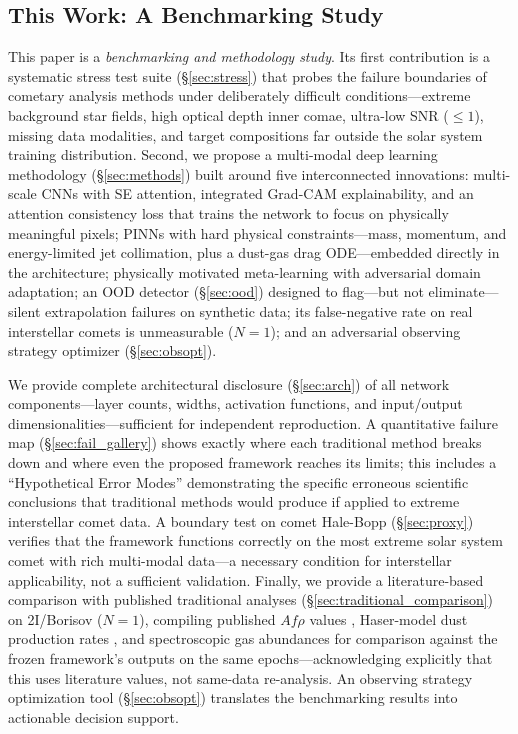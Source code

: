\documentclass[usenatbib]{mnras}
\begin{document}
\subsection{This Work: A Benchmarking Study}

This paper is a \textit{benchmarking and methodology study}. Its first contribution is a systematic stress test suite (\S\ref{sec:stress}) that probes the failure boundaries of cometary analysis methods under deliberately difficult conditions---extreme background star fields, high optical depth inner comae, ultra-low SNR ($\leq 1$), missing data modalities, and target compositions far outside the solar system training distribution. Second, we propose a multi-modal deep learning methodology (\S\ref{sec:methods}) built around five interconnected innovations: multi-scale CNNs with SE attention, integrated Grad-CAM explainability, and an attention consistency loss that trains the network to focus on physically meaningful pixels; PINNs with hard physical constraints---mass, momentum, and energy-limited jet collimation, plus a dust-gas drag ODE---embedded directly in the architecture; physically motivated meta-learning with adversarial domain adaptation; an OOD detector (\S\ref{sec:ood}) designed to flag---but not eliminate---silent extrapolation failures on synthetic data; its false-negative rate on real interstellar comets is unmeasurable ($N=1$); and an adversarial observing strategy optimizer (\S\ref{sec:obsopt}).

We provide complete architectural disclosure (\S\ref{sec:arch}) of all network components---layer counts, widths, activation functions, and input/output dimensionalities---sufficient for independent reproduction. A quantitative failure map (\S\ref{sec:fail_gallery}) shows exactly where each traditional method breaks down and where even the proposed framework reaches its limits; this includes a ``Hypothetical Error Modes'' demonstrating the specific erroneous scientific conclusions that traditional methods would produce if applied to extreme interstellar comet data. A boundary test on comet Hale-Bopp (\S\ref{sec:proxy}) verifies that the framework functions correctly on the most extreme solar system comet with rich multi-modal data---a necessary condition for interstellar applicability, not a sufficient validation. Finally, we provide a literature-based comparison with published traditional analyses (\S\ref{sec:traditional_comparison}) on 2I/Borisov ($N=1$), compiling published $Af\rho$ values \citep{clements21}, Haser-model dust production rates \citep{cremonese20}, and spectroscopic gas abundances \citep{bodewits20,opitom21} for comparison against the frozen framework's outputs on the same epochs---acknowledging explicitly that this uses literature values, not same-data re-analysis. An observing strategy optimization tool (\S\ref{sec:obsopt}) translates the benchmarking results into actionable decision support.
\end{document}
